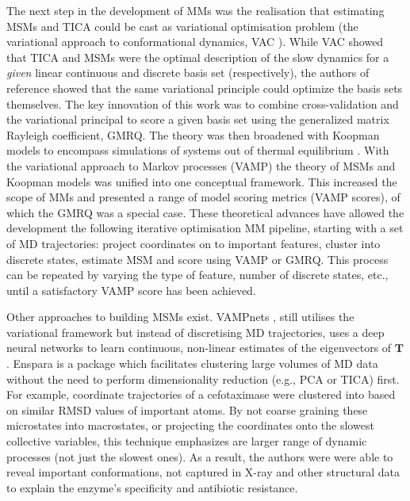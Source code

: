 The next step in the development of MMs was the realisation that estimating MSMs and TICA could be cast as variational optimisation problem (the variational approach to conformational dynamics, VAC \cite{nuskeVariationalApproachMolecular2014}). While VAC showed that TICA and MSMs were the optimal description of the slow dynamics for a \emph{given} linear continuous and discrete basis set (respectively), the authors of reference \cite{mcgibbonVariationalCrossvalidationSlow2015} showed that the same variational principle could optimize the basis sets themselves. The key innovation of this work was to combine cross-validation \cite{arlotSurveyCrossvalidationProcedures2009} and the variational principal to score a given basis set using the generalized matrix Rayleigh coefficient, GMRQ. The theory was then broadened with Koopman models to encompass simulations of systems out of thermal equilibrium \cite{wuVariationalKoopmanModels2017}. With the variational approach to Markov processes (VAMP) the theory of MSMs and Koopman models was unified into one conceptual framework. This increased the scope of MMs and presented a range of model scoring metrics (VAMP scores), of which the GMRQ was a special case. These theoretical advances have allowed the development the following iterative optimisation MM pipeline, starting with a set of MD trajectories: project coordinates on to important features, cluster into discrete states, estimate MSM and score using VAMP or GMRQ. This process can be repeated by varying the type of feature, number of discrete states, etc., until a satisfactory VAMP score has been achieved.   

Other approaches to building MSMs exist. VAMPnets \cite{mardtVAMPnetsDeepLearning2018}, still utilises the variational framework but instead of discretising MD trajectories, uses a deep neural networks to learn continuous, non-linear estimates of the eigenvectors of $\mathbf{T}$.  Enspara \cite{porterEnsparaModelingMolecular2019} is a package which facilitates clustering large volumes of MD data without the need to perform dimensionality reduction (e.g., PCA or TICA) first. For example, coordinate trajectories of a cefotaximase \cite{hartModellingProteinsHidden2016} were clustered into based on similar RMSD values of important atoms.  By not coarse graining these microstates into macrostates, or projecting the coordinates onto the slowest collective variables, this technique emphasizes are larger range of dynamic processes (not just the slowest ones). As a result, the authors were were able to reveal important conformations, not captured in X-ray and other structural data to explain the enzyme's specificity and antibiotic resistance.  


